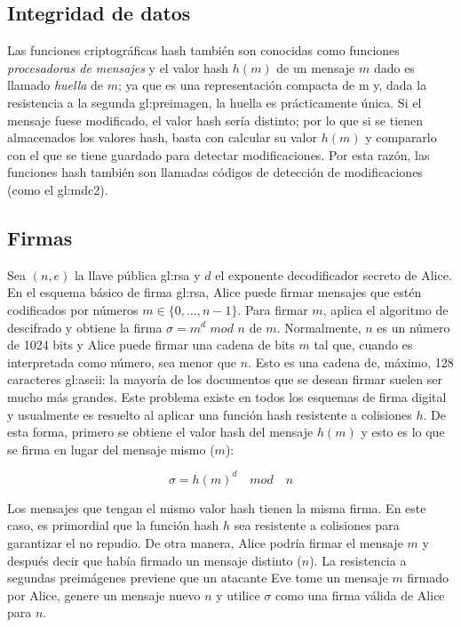 \subsection{Integridad de datos}

Las funciones criptográficas hash también son conocidas como funciones
\textit{procesadoras de mensajes} y el valor hash $h(m)$ de un mensaje
$m$ dado es llamado \textit{huella} de $m$; ya que es una representación
compacta de m y, dada la resistencia a la segunda \gls{gl:preimagen}, la huella
es prácticamente única. Si el mensaje fuese modificado, el valor hash
sería distinto; por lo que si se tienen almacenados los valores hash,
basta con calcular su valor $h(m)$ y compararlo con el que se tiene
guardado para detectar modificaciones. Por esta razón, las funciones
hash también son llamadas códigos de detección de modificaciones (como el
\gls{gl:mdc2}).

\subsection{Firmas}

Sea $(n, e)$ la llave pública \gls{gl:rsa} y $d$ el exponente decodificador
secreto de Alice. En el esquema básico de firma \gls{gl:rsa}, Alice puede
firmar mensajes que estén codificados por números $ m \in \{0, \dots, n-1\}$.
Para firmar $m$, aplica el algoritmo de descifrado y obtiene la firma
$\sigma = m^d$ $mod$ $n$ de $m$.
Normalmente, $n$ es un número de 1024 bits y Alice puede firmar una
cadena de bits $m$ tal que, cuando es interpretada como número, sea
menor que $n$. Esto es una cadena de, máximo, 128 caracteres
\gls{gl:ascii}: la mayoría de los documentos que se desean firmar suelen
ser mucho más grandes. Este problema existe en todos los esquemas de firma
digital y usualmente es resuelto al aplicar una función hash resistente a
colisiones $h$. De esta forma, primero se obtiene el valor hash del mensaje
$h(m)$ y esto es lo que se firma en lugar del mensaje mismo ($m$):

\begin{equation}
  \label{funcion_hash_sign}
  \sigma = h(m)^d \quad mod \quad n
\end{equation}

Los mensajes que tengan el mismo valor hash tienen la misma firma. En
este caso, es primordial que la función hash $h$ sea resistente a
colisiones para garantizar el no repudio. De otra manera, Alice podría
firmar el mensaje $m$ y después decir que había firmado un mensaje
distinto ($n$).
La resistencia a segundas preimágenes previene que un atacante Eve tome
un mensaje $m$ firmado por Alice, genere un mensaje nuevo $n$ y utilice
$\sigma$ como una firma válida de Alice para $n$.


